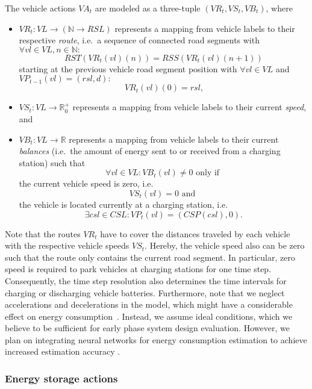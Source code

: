 The vehicle actions $VA_t$ are modeled as a three-tuple $(VR_t, VS_t, VB_t)$, where
\begin{itemize}
	\item $VR_t: VL \rightarrow (\mathbb{N} \rightarrow RSL)$ represents a mapping from vehicle labels to their respective \textit{route}, i.e.\ a sequence of connected road segments with $\forall vl \in VL, n \in \mathbb{N}:$
	\[
		RST(VR_t(vl)(n)) = RSS(VR_t(vl)(n + 1))
	\]
	starting at the previous vehicle road segment position with $\forall vl \in VL$ and $VP_{t-1}(vl) = (rsl, d):$
	\[
		VR_t(vl)(0) = rsl \textrm{,}
	\]
	\item $VS_t: VL \rightarrow \mathbb{R}_0^+$ represents a mapping from vehicle labels to their current \textit{speed}, and
	\item $VB_t: VL \rightarrow \mathbb{R}$ represents a mapping from vehicle labels to their current \textit{balances} (i.e.\ the amount of energy sent to or received from a charging station) such that
	\[
		\forall vl \in VL: VB_t(vl) \neq 0 \textrm{ only if }
	\]
	the current vehicle speed is zero, i.e.\
	\[
		 VS_t(vl) = 0 \textrm{ and }
	\]
	the vehicle is located currently at a charging station, i.e.\
	\[
		\exists csl \in CSL: VP_t(vl) = (CSP(csl), 0) \textrm{.}
	\]
\end{itemize}
Note that the routes $VR_t$ have to cover the distances traveled by each vehicle with the respective vehicle speeds $VS_t$. Hereby, the vehicle speed also can be zero such that the route only contains the current road segment. In particular, zero speed is required to park vehicles at charging stations for one time step. Consequently, the time step resolution also determines the time intervals for charging or discharging vehicle batteries. Furthermore, note that we neglect accelerations and decelerations in the model, which might have a considerable effect on energy consumption~\cite{gao2007modeling}. Instead, we assume ideal conditions, which we believe to be sufficient for early phase system design evaluation. However, we plan on integrating neural networks for energy consumption estimation to achieve increased estimation accuracy \cite{felipe2015energy}.

\subsubsection{Energy storage actions}
\label{actions_storages}

